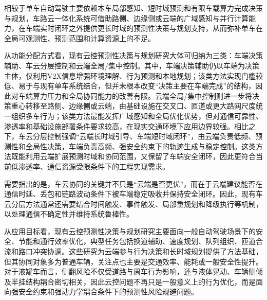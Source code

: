       相较于单车自动驾驶主要依赖本车局部感知、短时域预测和有限车载算力完成决策与规划，车路云一体化系统可借助路侧、边缘侧或云端的广域感知与并行计算能力，在车端实时闭环之外提供更长时域的预测性决策与规划支持，从而弥补单车在全局可观测性、预测范围和计算资源上的不足\cite{Huang2025V2X}。

      从功能分配方式看，现有云控预测性决策与规划研究大体可归纳为三类：车端决策辅助、车云分层控制和云端全局/集中控制\cite{Huang2025V2X}。其中，车端决策辅助仍以车端为决策主体，仅利用V2X信息增强环境理解、行为预测和本地规划\cite{UniV2X2024,UniMM_V2X2025,V2X_VLM2025}；该类方法实现门槛较低、易于与现有单车系统结合，但并未根本改变“决策主要在车端完成”的结构，因此对车端算力压力和全局协同能力的改善有限。云端全局/集中控制则进一步将决策重心转移至路侧、边缘侧或云端，由基础设施在交叉口、匝道或更大路网尺度统一组织多车行为\cite{Kherroubi2024AUTODRAITEC,Lu2024EdgeComputing,Typaldos2025Cooperative,Yang2025CloudBased,Wang2025Cooperative,shijia2024rampcloud}；该类方法最能发挥广域感知和全局优化优势，但对通信可靠性、渗透率和基础设施部署条件要求较高，在现实交通环境下应用边界较强。相比之下，车云分层控制强调“云端长时域引导、车端短时域闭环”，由云端负责低频、预测性和全局性决策，车端负责高频、强安全约束下的轨迹生成与稳定控制\cite{Gao2025V2X,hans2024,chenqien2023cpccbus,lishuyan2022pccheavytrucks,wangluyao2024cloudpacc,wangzhou2023hierarchical,meirun2023platoon,jiangyu2023lc}。这类方法既能利用云端扩展预测时域和协同范围，又保留了车端安全闭环，因此更符合当前低渗透率、通信资源受限条件下的工程实现需求。

      需要指出的是，车云协同的关键并不只是“云端是否更优”，而在于云端建议能否在通信时延、丢包和链路波动条件下被车端稳定吸收并保持安全闭环\cite{xionglu2024_CVIS_survay,xuqing2021unreliable,wang2021platoonmpc}。因此，现有车云分层方法通常还需要结合时间触发、事件触发、局部重规划和降级执行等机制，以处理通信不确定性并维持系统鲁棒性\cite{hans2024,wang2021platoonmpc}。

      从应用目标看，现有云控预测性决策与规划研究主要面向一般自动驾驶场景下的安全、节能和通行效率优化，典型任务包括换道辅助、速度规划、队列组织、匝道合流和路口冲突协调\cite{chenqien2023cpccbus,wangzhou2023hierarchical,meirun2023platoon,Typaldos2025Cooperative,Yang2025CloudBased}。这些研究为云端参与行为决策和长时域规划提供了方法基础，但其协同对象多为普通车辆，关注点也主要是交通效率、能耗或一般安全性提升。对于液罐车而言，侧翻风险不仅受道路与周车行为影响，还与液体晃动、车辆侧倾及半挂结构耦合密切相关，因此云控问题不再只是一般意义上的行为优化，而是面向强安全约束和强动力学耦合条件下的预测性风险规避问题。

